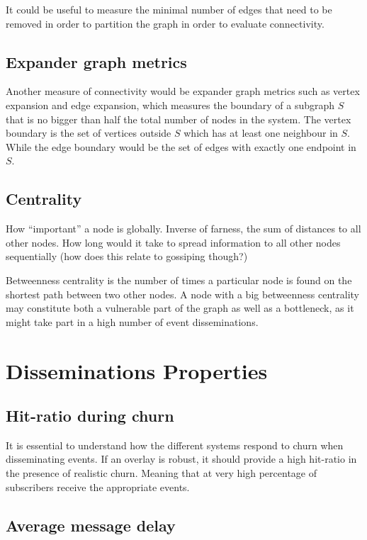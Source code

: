 It could be useful to measure the minimal number of edges that
need to be removed in order to partition the graph in order to
evaluate connectivity.

\subsection{Expander graph metrics}
Another measure of connectivity would be expander graph metrics
such as vertex expansion and edge expansion, which measures the
boundary of a subgraph $S$ that is no bigger than half the total
number of nodes in the system. The vertex boundary is the set of
vertices outside $S$ which has at least one neighbour in $S$.
While the edge boundary would be the set of edges with exactly
one endpoint in $S$.

\subsection{Centrality}


How ``important'' a node is globally. Inverse of farness, the sum of
distances to all other nodes. How long would it take to spread
information to all other nodes sequentially (how does this relate to
gossiping though?)

Betweenness centrality is the number of times a particular node
is found on the shortest path between two other nodes. A node
with a big betweenness centrality may constitute both a
vulnerable part of the graph as well as a bottleneck, as it
might take part in a high number of event disseminations.

\section{Disseminations Properties}

\subsection{Hit-ratio during churn}

It is essential to understand how the different systems respond to
churn when disseminating events. If an overlay is robust, it should
provide a high hit-ratio in the presence of realistic churn.
Meaning that at very high percentage of subscribers receive the
appropriate events.

\subsection{Average message delay}

